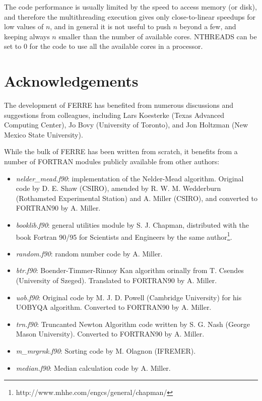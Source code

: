 \documentclass[12pt]{article}
\begin{document}
The code performance is usually limited by the speed to access memory (or disk),
and therefore the multithreading execution gives only close-to-linear speedups 
for low values of $n$, and in general it is not useful to push $n$ beyond a few,
and keeping always $n$ smaller than the number of available cores. NTHREADS can
be set to 0 for the code to use all the available cores in a processor.

\section{Acknowledgements}

The development of FERRE has benefited from numerous discussions and suggestions
from colleagues, including 
Lars Koesterke (Texas Advanced Computing Center), Jo Bovy (University of Toronto), and
Jon Holtzman (New Mexico State University).

While the bulk of FERRE has been written from scratch, it benefits from a number of FORTRAN
modules publicly available from other authors:

\begin{itemize}
\item {\it nelder\_mead.f90}: implementation of the Nelder-Mead algorithm. 
Original code by D. E. Shaw (CSIRO), amended by R. W. M. Wedderburn
 (Rothamsted Experimental Station) and A. Miller (CSIRO), and converted to FORTRAN90 by
 A. Miller.

\item {\it booklib.f90}: general utilities module by S. J. Chapman, distributed with the book 
Fortran 90/95 for Scientists and Engineers by the same author\footnote{http://www.mhhe.com/engcs/general/chapman/}.

\item {\it random.f90}: random number code by A. Miller.

\item {\it btr.f90}: Boender-Timmer-Rinnoy Kan algorithm orinally from T. Csendes (University of Szeged).
Translated to FORTRAN90 by A. Miller.

\item {\it uob.f90}: Original code by M. J. D. Powell (Cambridge University) for his UOBYQA algorithm. 
Converted to FORTRAN90 by A. Miller.

\item {\it trn.f90}: Truncanted Newton Algorithm code written by S. G. Nash (George Mason University).
Converted to FORTRAN90 by A. Miller.

\item {\it m\_mrgrnk.f90}: Sorting code by M. Olagnon (IFREMER).

\item {\it median.f90}: Median calculation code by A. Miller.
\end{itemize}
\end{document}
